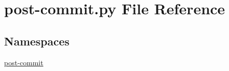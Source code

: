 \section{post-\/commit.py File Reference}
\label{post-commit_8py}
\subsection*{Namespaces}
\begin{DoxyCompactItemize}
\item 
\hyperlink{namespacepost-commit}{post-\/commit}
\end{DoxyCompactItemize}
